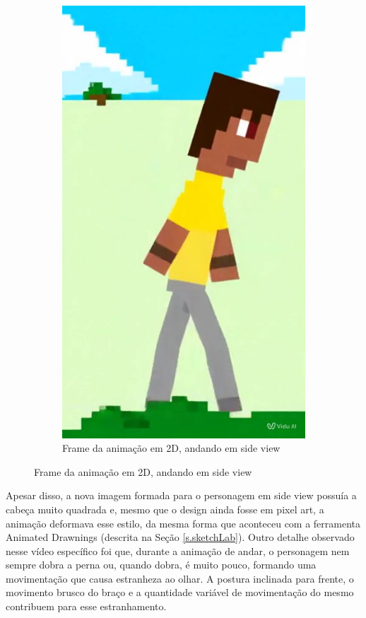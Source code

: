 \begin{figure}[htbp]
\begin{subfigure}{0.45\linewidth}
        \includegraphics[width=0.8\linewidth]{figs/vidu/frame3.jpg}
        \caption{\small Frame da animação em 2D, andando em side view}
        \label{fig:viduFrame2D}
    \end{subfigure}
\end{figure}

Apesar disso, a nova imagem formada para o personagem em side view possuía a cabeça muito quadrada e, mesmo que o design ainda fosse em pixel art, a animação deformava esse estilo, da mesma forma que aconteceu com a ferramenta Animated Drawnings (descrita na Seção \ref{s.sketchLab}). Outro detalhe observado nesse vídeo específico foi que, durante a animação de andar, o personagem nem sempre dobra a perna ou, quando dobra, é muito pouco, formando uma movimentação que causa estranheza ao olhar. A postura inclinada para frente, o movimento brusco do braço e a quantidade variável de movimentação do mesmo contribuem para esse estranhamento. 

